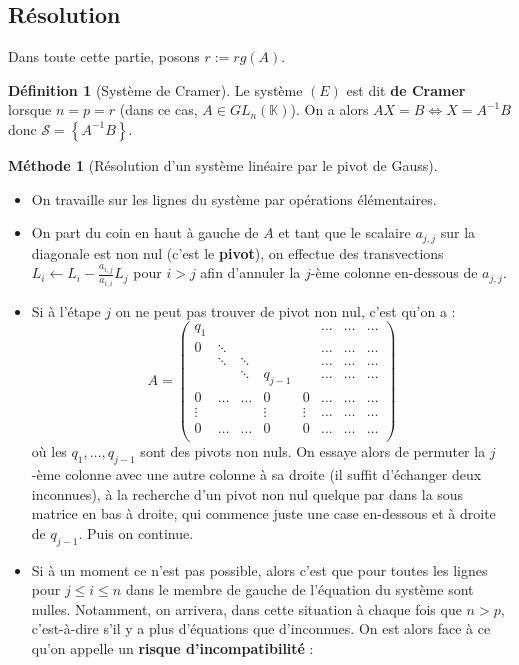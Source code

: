 \documentclass[french]{book}
\newcommand{\K}{\mathbb{K}}
\newcommand{\inv}{^{-1}}
\theoremstyle{plain}
\theoremstyle{definition}
\newtheorem{dfn}{Définition}[chapter]
\newtheorem{met}{Méthode}[chapter]
\theoremstyle{remark}
\begin{document}
\subsection{Résolution}
Dans toute cette partie, posons $r:=rg(A)$.
\begin{dfn}[Système de Cramer]
	Le système $(E)$ est dit \textbf{de Cramer} lorsque $n=p=r$ (dans ce cas, $A\in GL_n(\K)$). On a alors $AX=B\iff X=A\inv B$ donc $\mathcal{S}=\left\{A\inv B\right\}$.
\end{dfn}
\begin{met}[Résolution d'un système linéaire par le pivot de Gauss]
	\begin{itemize}
		\item On travaille sur les lignes du système par opérations élémentaires.
		\item On part du coin en haut à gauche de $A$ et tant que le scalaire $a_{j,j}$ sur la diagonale est non nul (c'est le \textbf{pivot}), on effectue des transvections $L_i\leftarrow L_i-\displaystyle\frac{a_{i,j}}{a_{i,i}}L_j$ pour $i>j$ afin d'annuler la $j$-ème colonne en-dessous de $a_{j,j}$.
		\item Si à l'étape $j$ on ne peut pas trouver de pivot non nul, c'est qu'on a : $$A=\begin{pmatrix}
			q_1&&&&&\ldots&\ldots&\ldots \\
			0&\ddots&&&&\ldots&\ldots&\ldots\\
			&\ddots&\ddots&&&\ldots&\ldots&\ldots\\
			&&\ddots&q_{j-1}&&\ldots&\ldots&\ldots\\
			0&\ldots&\ldots&0&0&\ldots&\ldots&\ldots\\
			\vdots&&&\vdots&\vdots&\ldots&\ldots&\ldots\\
			0&\ldots&\ldots&0&0&\ldots&\ldots&\ldots\\
		\end{pmatrix}$$ où les $q_1,\ldots,q_{j-1}$ sont des pivots non nuls. On essaye alors de permuter la $j$-ème colonne avec une autre colonne à sa droite (il suffit d'échanger deux inconnues), à la recherche d'un pivot non nul quelque par dans la sous matrice en bas à droite, qui commence juste une case en-dessous et à droite de $q_{j-1}$. Puis on continue.
		\item Si à un moment ce n'est pas possible, alors c'est que pour toutes les lignes pour $j\leqslant i\leqslant n$ dans le membre de gauche de l'équation du système sont nulles. Notamment, on arrivera, dans cette situation à chaque fois que $n>p$, c'est-à-dire s'il y a plus d'équations que d'inconnues. On est alors face à ce qu'on appelle un \textbf{risque d'incompatibilité} :

\end{itemize}
\end{met}
\end{document}
